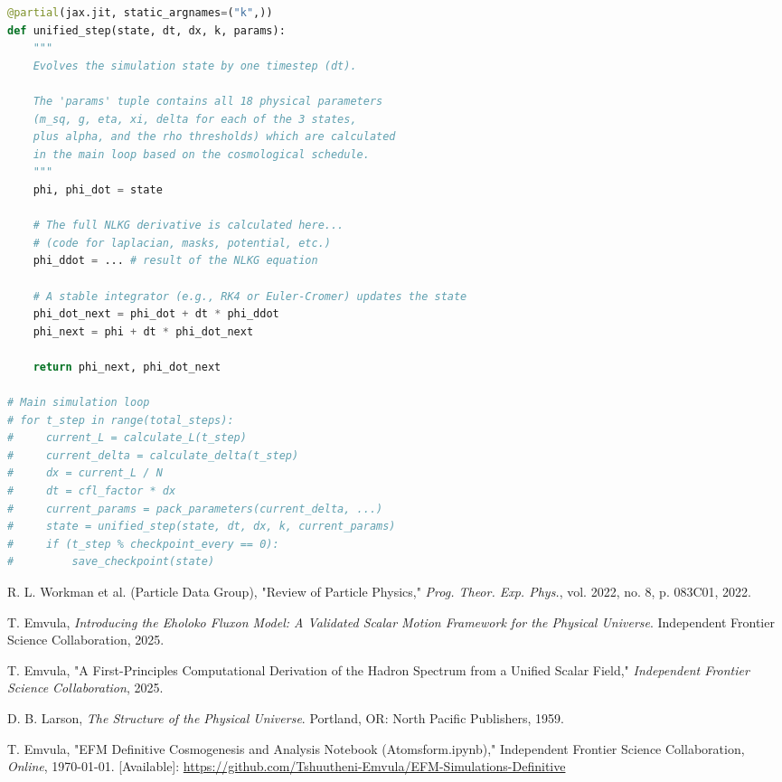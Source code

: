 \documentclass[11pt]{article}
\begin{document}
\begin{lstlisting}[language=Python, caption=Conceptual JAX-based EFM Simulation Step]
@partial(jax.jit, static_argnames=("k",))
def unified_step(state, dt, dx, k, params):
    """
    Evolves the simulation state by one timestep (dt).
    
    The 'params' tuple contains all 18 physical parameters 
    (m_sq, g, eta, xi, delta for each of the 3 states, 
    plus alpha, and the rho thresholds) which are calculated
    in the main loop based on the cosmological schedule.
    """
    phi, phi_dot = state
    
    # The full NLKG derivative is calculated here...
    # (code for laplacian, masks, potential, etc.)
    phi_ddot = ... # result of the NLKG equation
    
    # A stable integrator (e.g., RK4 or Euler-Cromer) updates the state
    phi_dot_next = phi_dot + dt * phi_ddot
    phi_next = phi + dt * phi_dot_next
    
    return phi_next, phi_dot_next

# Main simulation loop
# for t_step in range(total_steps):
#     current_L = calculate_L(t_step)
#     current_delta = calculate_delta(t_step)
#     dx = current_L / N
#     dt = cfl_factor * dx
#     current_params = pack_parameters(current_delta, ...)
#     state = unified_step(state, dt, dx, k, current_params)
#     if (t_step % checkpoint_every == 0):
#         save_checkpoint(state)
\end{lstlisting}


\begin{thebibliography}{99}
\raggedright

R. L. Workman et al. (Particle Data Group), "Review of Particle Physics," \textit{Prog. Theor. Exp. Phys.}, vol. 2022, no. 8, p. 083C01, 2022.

T. Emvula, \textit{Introducing the Eholoko Fluxon Model: A Validated Scalar Motion Framework for the Physical Universe}. Independent Frontier Science Collaboration, 2025.

T. Emvula, "A First-Principles Computational Derivation of the Hadron Spectrum from a Unified Scalar Field," \textit{Independent Frontier Science Collaboration}, 2025.

D. B. Larson, \textit{The Structure of the Physical Universe}. Portland, OR: North Pacific Publishers, 1959.

T. Emvula, "EFM Definitive Cosmogenesis and Analysis Notebook (Atomsform.ipynb)," Independent Frontier Science Collaboration, \textit{Online}, \today. [Available]: \url{https://github.com/Tshuutheni-Emvula/EFM-Simulations-Definitive}

\end{thebibliography}
\end{document}
